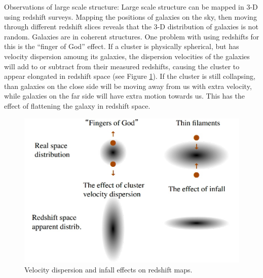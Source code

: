 Observations of large scale structure:\newline
Large scale structure can be mapped in 3-D using redshift surveys.  Mapping 
the positions of galaxies on the sky, then moving through different redshift 
slices reveals that the 3-D distribution of galaxies is not random.  Galaxies 
are in coherent structures.  One problem with using redshifts for this is 
the ``finger of God'' effect.  If a cluster is physically spherical, but has 
velocity dispersion amoung its galaxies, the dispersion velocities of the 
galaxies will add to or subtract from their measured redshifts, causing the 
cluster to appear elongated in redshift space (see Figure \ref{fig:finger}).  
If the cluster is still collapsing, than galaxies on the close side will 
be moving away from us with extra velocity, while galaxies on the far side 
will have extra motion towards us.  This has the effect of flattening 
the galaxy in redshift space.  

\begin{figure}[!h]
\begin{center}
\includegraphics[width=\textwidth]{finger.jpg}
\end{center}
\caption{Velocity dispersion and infall effects on redshift maps. 
\label{fig:finger}}
\end{figure}

